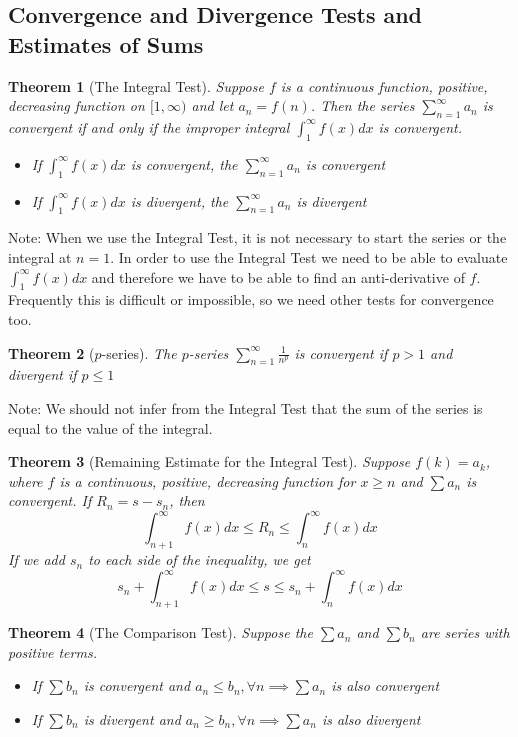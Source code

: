 \documentclass[10pt]{report}
\newtheorem{thm2}{Theorem}[section]
\begin{document}
\subsection{Convergence and Divergence Tests and Estimates of Sums}
\begin{thm2}[The Integral Test]
Suppose $f$ is a continuous function, positive, decreasing function on $[1, \infty)$ and let $a_n = f(n)$. Then the series $\sum_{n=1}^\infty a_n$ is convergent if and only if the improper integral $\int_1^\infty f(x)dx$ is convergent.
\begin{itemize}
\item[(i)] If $\int_1^\infty f(x)dx$ is convergent, the $\sum_{n=1}^\infty a_n$ is convergent
\item[(ii)] If $\int_1^\infty f(x)dx$ is divergent, the $\sum_{n=1}^\infty a_n$ is divergent
\end{itemize}
\end{thm2}
Note: When we use the Integral Test, it is not necessary to start the series or the integral at $n=1$. In order to use the Integral Test we need to be able to evaluate $\int_1^\infty f(x)dx$ and therefore we have to be able to find an anti-derivative of $f$. Frequently this is difficult or impossible, so we need other tests for convergence too.
\begin{thm2}[$p$-series]
The $p$-series $\sum_{n=1}^\infty \frac{1}{n^p}$ is convergent if $p>1$ and divergent if $p\leq 1$
\end{thm2}
Note: We should not infer from the Integral Test that the sum of the series is equal to the value of the integral.
\begin{thm2}[Remaining Estimate for the Integral Test]
Suppose $f(k) = a_k$, where $f$ is a continuous, positive, decreasing function for $x\geq n$ and $\sum a_n$ is convergent. If $R_n = s- s_n$, then
$$\int_{n+1}^\infty f(x)dx \leq R_n \leq \int_n^\infty f(x)dx$$
If we add $s_n$ to each side of the inequality, we get
$$s_n + \int_{n+1}^\infty f(x)dx \leq s \leq s_n + \int_n^\infty f(x)dx$$
\end{thm2}
\begin{thm2}[The Comparison Test]
Suppose the $\sum a_n$ and $\sum b_n$ are series with positive terms.
\begin{itemize}
\item[(i)] If $\sum b_n$ is convergent and $a_n\leq b_n, \forall n \implies \sum a_n$ is also convergent
\item[(ii)] If $\sum b_n$ is divergent and $a_n\geq b_n, \forall n \implies \sum a_n$ is also divergent
\end{itemize}
\end{thm2}
\end{document}
